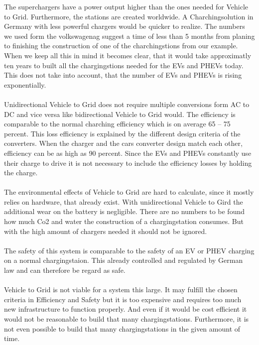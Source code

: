 \begin{parcolumns}[colwidths={1=2.5 cm, 2=10 cm, 3=2.5cm}]{3}
{%
The superchargers have a power output higher than the ones needed for Vehicle to Grid. Furthermore, the stations are created worldwide. A Charchingsolution in Germany with less powerful chargers would be quicker to realize. The numbers we used form the volkswagenag suggest a time of less than 5 months from planing to finishing the construction of one of the charchingstions from our example. When we keep all this in mind it becomes clear, that it would take approximatly ten years to built all the chargingstions needed for the EVs and PHEVs today. This does not take into account, that the number of EVs and PHEVs is rising exponentially.
\\ \\
\noindent
Unidirectional Vehicle to Grid does not require multiple conversions form AC to DC and vice versa like bidirectional Vehicle to Grid would. The efficiency is comparable to the normal charching efficiency which is on average 65 – 75 percent. This loss efficiency is explained by the different design criteria of the converters. When the charger and the cars converter design match each other, efficiency can be as high as 90 percent. Since the EVs and PHEVs constantly use their charge to drive it is not necessary to include the efficiency losses by holding the charge.%
\\ \\
\noindent
The environmental effects of Vehicle to Grid are hard to calculate, since it mostly relies on hardware, that already exist. With unidirectional Vehicle to Gird the additional wear on the battery is negligible. There are no numbers to be found how much Co2 and water the construction of a chargingstation consumes. But with the high amount of chargers needed it should not be ignored.
\\ \\
\noindent
The safety of this system is comparable to the safety of an EV or PHEV charging on a normal chargingstaion. This already controlled and regulated by German law and can therefore be regard as safe.%
\\ \\
\noindent
Vehicle to Grid is not viable for a system this large. It may fulfill the chosen criteria in Efficiency and Safety but it is too expensive and requires too much new infrastructure to function properly. And even if it would be cost efficient it would not be reasonable to build that many chargingstations. Furthermore, it is not even possible to build that many chargingstations in the given amount of time.
}
\end{parcolumns}
